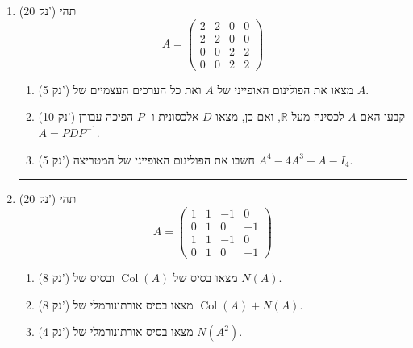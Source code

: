 \documentclass[12pt, a4paper]{article}
\newcommand{\rr}{\mathbb{R}}
\newcommand{\points}[1]{(#1 נק') }
\DeclareMathOperator{\col}{Col}
\begin{document}
\begin{enumerate}
\newcommand{\firstQ}{
\item \points{20}
תהי
\[A = \begin{pmatrix}
    2 & 2 & 0 & 0\\
    2 & 2 & 0 & 0\\
    0 & 0 & 2 & 2 \\
    0 & 0 & 2 & 2
\end{pmatrix} \]
\begin{enumerate}
    \item\points{5} 
    מצאו את הפולינום האופייני של $A$  ואת כל הערכים העצמיים של $A$.
    \item\points{10}
    קבעו
    האם $A$ לכסינה מעל $\rr$,
    ואם כן, מצאו $D$ אלכסונית
    ו-
    $P$
    הפיכה עבורן
    $A=PDP^{-1}$.
    \item\points{5} 
     חשבו את הפולינום האופייני של המטריצה
     $A^4-4A^3+A-I_4$.
    \end{enumerate}

}
\firstQ
\noindent\rule{\textwidth-30pt}{0.4pt}

\newcommand{\secondQ}{
\item \points{20}
תהי
\[
A=
\begin{pmatrix}
1 & 1 & -1 & 0 \\
0 & 1 & 0  & -1 \\
1 & 1 & -1 & 0 \\
0 & 1 & 0 & -1
\end{pmatrix}
\]
\begin{enumerate}
\item\points{8} מצאו בסיס של $\col(A)$ ובסיס של $N(A)$.
\item\points{8}
מצאו בסיס אורתונורמלי של
$\col(A)+N(A)$.
\item\points{4} מצאו בסיס
אורתונורמלי של
$N(A^2)$.

\end{enumerate}
}
\secondQ


\end{enumerate}
\end{document}
